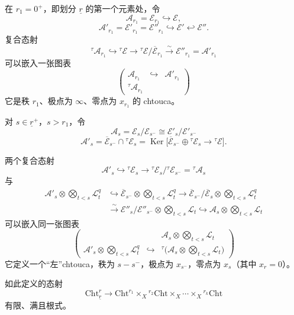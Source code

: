 在 $r_1=0^+$，即划分 $\underline{r}$ 的第一个元素处，令
\[
\mathcal{A}_{r_1}=\mathcal{E}_{r_1}\hookrightarrow\mathcal{E},
\]
\[
\mathcal{A}'_{r_1}=\mathcal{E}'_{r_1}=\mathcal{E}''_{r_1}\hookrightarrow\mathcal{E}'\hookleftarrow\mathcal{E}''.
\]
复合态射
\[
{}^\tau\mathcal{A}_{r_1}\hookrightarrow{}^\tau\mathcal{E}\to{}^\tau\mathcal{E}/\overline{\mathcal{E}}_{r_1}\xrightarrow{\sim}\mathcal{E}''_{r_1}=\mathcal{A}'_{r_1}
\]
可以嵌入一张图表
\[
\begin{pmatrix}
\mathcal{A}_{r_1} & \hookrightarrow & \mathcal{A}'_{r_1}\\
{}^\tau\mathcal{A}_{r_1} & &
\end{pmatrix}
\]
它是秩 $r_1$、极点为 $\infty$、零点为 $x_{r_1}$ 的 chtouca。

对 $s\in\underline{r}^+$，$s>r_1$，令
\[
\mathcal{A}_s=\mathcal{E}_s/\mathcal{E}_{s^-}\cong\mathcal{E}'_s/\mathcal{E}'_{s^-}
\]
\[
\mathcal{A}'_s=\overline{\mathcal{E}}_{s^-}\cap{}^\tau\mathcal{E}_s=\operatorname{Ker}\bigl[\overline{\mathcal{E}}_{s^-}\oplus{}^\tau\mathcal{E}_s\to{}^\tau\mathcal{E}\bigr].
\]

两个复合态射
\[
\mathcal{A}'_s\hookrightarrow{}^\tau\mathcal{E}_s\to{}^\tau\mathcal{E}_s/{}^\tau\mathcal{E}_{s^-}={}^\tau\mathcal{A}_s
\]
与
\begin{align*}
\mathcal{A}'_s\otimes\bigotimes_{t<s}\mathcal{L}_t^q&\hookrightarrow\overline{\mathcal{E}}_{s^-}\otimes\bigotimes_{t<s}\mathcal{L}_t^q\to\overline{\mathcal{E}}_{s^-}/\overline{\mathcal{E}}_s\otimes\bigotimes_{t<s}\mathcal{L}_t^q\\
&\xrightarrow{\sim}\mathcal{E}''_s/\mathcal{E}''_{s^-}\otimes\bigotimes_{t<s}\mathcal{L}_t\hookrightarrow\mathcal{A}_s\otimes\bigotimes_{t<s}\mathcal{L}_t
\end{align*}
可以嵌入同一张图表
\[
\begin{pmatrix}
& & \mathcal{A}_s\otimes\bigotimes_{t<s}\mathcal{L}_t\\
\mathcal{A}'_s\otimes\bigotimes_{t<s}\mathcal{L}_t^q & \hookrightarrow & {}^\tau\bigl(\mathcal{A}_s\otimes\bigotimes_{t<s}\mathcal{L}_t\bigr)
\end{pmatrix}
\]
它定义一个“左”chtouca，秩为 $s-s^-$，极点为 $x_{s^-}$，零点为 $x_s$（其中 $x_r=0$）。

\begin{proposition*}
如此定义的态射
\[
\mathrm{Cht}^r_{\underline{r}}\to\mathrm{Cht}^{r_1}\times_X{}^{r_2}\mathrm{Cht}\times_X\cdots\times_X{}^{r_k}\mathrm{Cht}
\]
有限、满且根式。
\end{proposition*}

